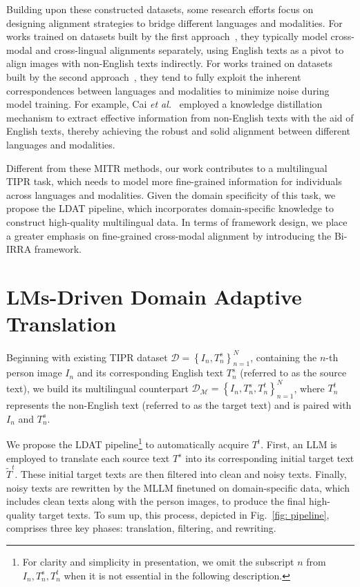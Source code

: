 \documentclass[10pt,journal,compsoc]{IEEEtran}
\begin{document}
Building upon these constructed datasets, some research efforts focus on designing alignment strategies to bridge different languages and modalities. For works trained on datasets built by the first approach~\cite{fei2021cross, ni2021m3p, carlsson2022cross, jain2021mural, li2023unifying}, they typically model cross-modal and cross-lingual alignments separately, using English texts as a pivot to align images with non-English texts indirectly. For works trained on datasets built by the second approach~\cite{zhang2022multi, wang2022cross, wang2024dual, wang2024cl2cm, cai2024cross}, they tend to fully exploit the inherent correspondences between languages and modalities to minimize noise during model training.
For example, Cai \textit{et al.}~\cite{cai2024cross} employed a knowledge distillation mechanism to extract effective information from non-English texts with the aid of English texts, thereby achieving the robust and solid alignment between different languages and modalities.

Different from these MITR methods, our work contributes to a multilingual TIPR task, which needs to model more fine-grained information for individuals across languages and modalities.
Given the domain specificity of this task, we propose the LDAT pipeline, which incorporates domain-specific knowledge to construct high-quality multilingual data. 
In terms of framework design, we place a greater emphasis on fine-grained cross-modal alignment by introducing the Bi-IRRA framework.

\section{LMs-Driven Domain Adaptive Translation} 
\label{sec:data}

Beginning with existing TIPR dataset $\mathcal{D}=\left\{I_n, T^s_n \right\}^{N}_{n=1}$, containing the \(n\)-th person image $I_n$ and its corresponding English text $T^s_n$ (referred to as the source text), we build its multilingual counterpart $\mathcal{D}_\mathcal{M}=\left\{I_n, T^s_n, T^t_n \right\}^{N}_{n=1}$, where \( T^t_n\) represents the non-English text (referred to as the target text) and is paired with \(I_n\) and \(T^s_n\).

We propose the LDAT pipeline\footnote{For clarity and simplicity in presentation, we omit the subscript \( n \) from \( I_n, T^s_n, T^t_n \) when it is not essential in the following description.} to automatically acquire $T^t$.
First, an LLM is employed to translate each source text \(T^s\) into its corresponding initial target text \( \widetilde{T}^t \). 
These initial target texts are then filtered into clean and noisy texts. 
Finally, noisy texts are rewritten by the MLLM finetuned on domain-specific data, which includes clean texts along with the person images, to produce the final high-quality target texts.
To sum up, this process, depicted in Fig.~\ref{fig: pipeline}, comprises three key phases: translation, filtering, and rewriting.
\end{document}
